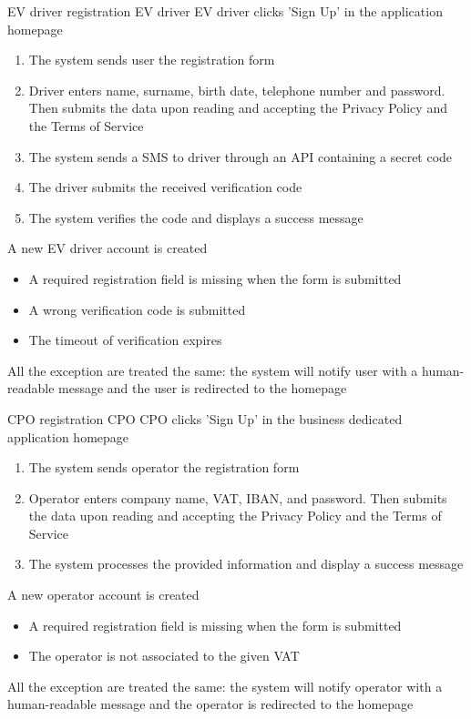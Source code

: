 \usecase
{EV driver registration}
{EV driver}
{EV driver clicks 'Sign Up' in the application homepage}
{
    \begin{enumerate}
        \item The system sends user the registration form
        \item Driver enters name, surname, birth date, telephone number and password. Then submits the data upon reading and accepting the Privacy Policy and the Terms of Service
        \item The system sends a SMS to driver through an API containing a secret code
        \item The driver submits the received verification code
        \item The system verifies the code and displays a success message
    \end{enumerate}
}
{A new EV driver account is created}
{
    \begin{itemize}
        \item A required registration field is missing when the form is submitted
        \item A wrong verification code is submitted
        \item The timeout of verification expires
    \end{itemize}
}
{
    All the exception are treated the same: the system will notify user with a human-readable message and the user is redirected to the homepage
}

\usecase
{CPO registration} %
{CPO} %
{CPO clicks 'Sign Up' in the business dedicated application homepage} %
{ %
    \begin{enumerate}
        \item The system sends operator the registration form
        \item Operator enters company name, VAT, IBAN, and password. Then submits the data upon reading and accepting the Privacy Policy and the Terms of Service
        \item The system processes the provided information and display a success message
    \end{enumerate}
}
{A new operator account is created} %
{ %
    \begin{itemize}
        \item A required registration field is missing when the form is submitted
        \item The operator is not associated to the given VAT
    \end{itemize}
}
{ %
    All the exception are treated the same: the system will notify operator with a human-readable message and the operator is redirected to the homepage
}

